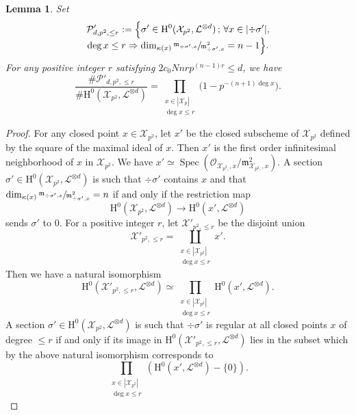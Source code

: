 \documentclass[JEP,XML,SOM,Unicode,published]{cedram}
\newcommand{\sep}{\,;\,}
\theoremstyle{plain}
\newtheorem{lem}[thm]{Lemma}
\theoremstyle{definition}
\newcommand{\ho}{\mathrm{H}}
\newcommand{\Oc}{\mathcal{O}}
\newcommand{\m}{\mathfrak{m}}
\newcommand{\X}{\mathcal{X}}
\newcommand{\li}{\mathcal{L}}
\DeclareMathOperator{\Spec}{Spec}
\begin{document}
\begin{lem}\label{smalldegree}
Set
\begin{multline*}
\mathcal{P}'_{d,p^2,\leq r}:=\Bigl\{ \sigma'\in \ho^0(\X_{p^2}, \li^{\otimes d})\sep \forall x\in |{\div\sigma'}|,\\[-5pt] \deg x\leq r\Rightarrow \dim_{\kappa(x)}\sfrac{\m_{\div \sigma',x}}{\m^2_{\div \sigma', x}}=n-1 \Bigr\}.
\end{multline*}
For any positive integer $r$ satisfying $2c_0Nnrp^{(n-1)r}\leq d$, we have
\[
\frac{\#\mathcal{P}'_{d,p^2,\leq r}}{\#\ho^0(\X_{p^2}, \li^{\otimes d})}=\prod_{\substack{x\in |\X_{p}|\\ \deg x\leq r}} \bigl(1-p^{-(n+1)\deg x} \bigr).
\]
\end{lem}
\begin{proof}
For any closed point $x\in \X_{p^2}$, let $x'$ be the closed subscheme of $\X_{p^2}$ defined by the square of the maximal ideal of $x$. Then $x'$ is the first order infinitesimal neighborhood of $x$ in $\X_{p^2}$. We have $x'\simeq \Spec (\Oc_{\X_{p^2,},x}/\mathfrak{m}_{\X_{p^2,},x}^2)$. A section $\sigma'\in \ho^0(\X_{p^2}, \li^{\otimes d})$ is such that $\div \sigma'$ contains $x$ and that $ \dim_{\kappa(x)}\sfrac{\m_{\div \sigma',x}}{\m^2_{\div \sigma', x}}=n$ if and only if the restriction map\vspace*{-3pt}
\[
\ho^0(\X_{p^2}, \li^{\otimes d}) \to \ho^0(x', \li^{\otimes d})
\]
sends $\sigma'$ to $0$. For a positive integer $r$, let $\X'_{p^2,\leq r}$ be the disjoint union\vspace*{-3pt}
\[
\X'_{p^2,\leq r}=\coprod_{\substack{x\in |\X_{p^2}|\\ \deg x\leq r}}x'.\]
Then we have a natural isomorphism\vspace*{-3pt}
\[
\ho^0(\X'_{p^2,\leq r}, \li^{\otimes d})\simeq \prod_{\substack{x\in |\X_{p^2}|\\ \deg x\leq r}}\ho^0(x', \li^{\otimes d}).
\]
A section $\sigma'\in \ho^0(\X_{p^2}, \li^{\otimes d})$ is such that $\div \sigma'$ is regular at all closed points $x$ of degree $\leq r$ if and only if its image in $\ho^0(\X'_{p^2,\leq r}, \li^{\otimes d})$ lies in the subset which by the above natural isomorphism corresponds to\vspace*{-3pt}
\[
\prod_{\substack{x\in |\X_{p^2}|\\ \deg x\leq r}}\left(\ho^0(x', \li^{\otimes d})-\{0\}\right).
\]


\end{proof}
\end{document}
